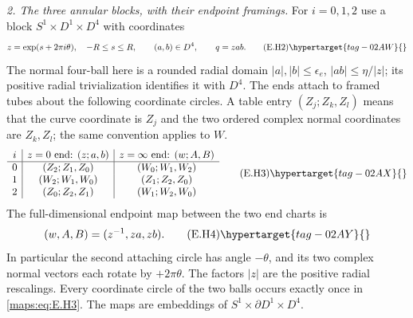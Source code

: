\begin{theorem}
\emph{2. The three annular blocks, with their endpoint framings.}
For $i=0,1,2$ use a block $S^1\times D^1\times D^4$ with coordinates
\[
 z=\exp(s+2\pi i\theta),\quad -R\leq s\leq R,
 \qquad (a,b)\in D^4,\qquad q=zab.
 \tag{E.H2}\hypertarget{tag-02AW}{}\label{maps:eq:E.H2}
\]
The normal four-ball here is a rounded radial domain
$|a|,|b|\leq\epsilon_e$, $|ab|\leq\eta/|z|$;
its positive radial trivialization identifies it with $D^4$.
The ends attach to framed tubes about the following coordinate
circles.  A table entry $(Z_j;Z_k,Z_l)$ means that the curve
coordinate is $Z_j$ and the two ordered complex normal coordinates
are $Z_k,Z_l$; the same convention applies to $W$.
\[
\begin{array}{c|c|c}
 i&z=0\hbox{ end: }(z;a,b)&z=\infty\hbox{ end: }(w;A,B)\\ \hline
0&(Z_2;Z_1,Z_0)&(W_0;W_1,W_2)\\
1&(W_2;W_1,W_0)&(Z_1;Z_2,Z_0)\\
2&(Z_0;Z_2,Z_1)&(W_1;W_2,W_0)
\end{array}
\tag{E.H3}\hypertarget{tag-02AX}{}\label{maps:eq:E.H3}
\]
The full-dimensional endpoint map between the two end charts is
\[
                 (w,A,B)=(z^{-1},za,zb).
 \tag{E.H4}\hypertarget{tag-02AY}{}\label{maps:eq:E.H4}
\]
In particular the second attaching circle has angle $-\theta$,
and its two complex normal vectors each rotate by $+2\pi\theta$.
The factors $|z|$ are the positive radial rescalings.
  Every coordinate circle
of the two balls occurs exactly once in \eqref{maps:eq:E.H3}.  The maps are
embeddings of $S^1\times\partial D^1\times D^4$.


\end{theorem}
